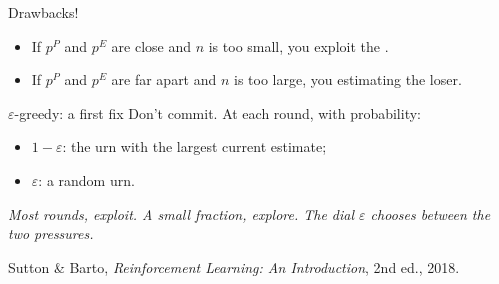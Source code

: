 \begin{frame}{Drawbacks!}
  \begin{center}
  \end{center}

  \medskip
  \begin{itemize}
    \setlength{\itemsep}{0.3em}
    \item If $p^P$ and $p^E$ are close and $n$ is too small,
          you exploit the .
    \item If $p^P$ and $p^E$ are far apart and $n$ is too large,
          you  estimating the loser.
  \end{itemize}
\end{frame}

\begin{frame}{$\varepsilon$-greedy: a first fix}
  Don't commit.  At each round, with probability:

  \medskip
  \begin{itemize}
    \setlength{\itemsep}{0.5em}
    \item $1 - \varepsilon$:  the urn with the
          largest current estimate;
    \item $\varepsilon$:  a random urn.
  \end{itemize}

  \medskip
  \begin{center}
    \itshape\color{mutedWarmGray}
    Most rounds, exploit.  A small fraction, explore.
    The dial $\varepsilon$ chooses between the two pressures.
  \end{center}

  \begin{center}
    \tiny\color{mutedWarmGray}
    Sutton \& Barto, \emph{Reinforcement Learning: An Introduction}, 2nd ed., 2018.
  \end{center}
\end{frame}

